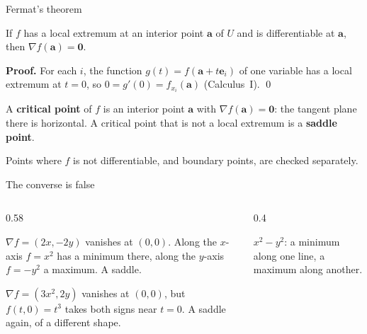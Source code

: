 \documentclass[10pt]{wosm-slides}
\newcommand{\va}{\mathbf{a}}
\begin{document}
\begin{frame}{Fermat's theorem}
  \begin{theorem}[Fermat]
    If $f$ has a local extremum at an interior point $\va$ of $U$ and is differentiable at $\va$,
    then $\nabla f(\va) = \mathbf 0$.
  \end{theorem}
  \pause
  \textbf{Proof.} For each $i$, the function $g(t) = f(\va + t\mathbf e_i)$ of one variable has a
  local extremum at $t = 0$, so $0 = g'(0) = f_{x_i}(\va)$ (Calculus~I). \qed
  \pause
  \begin{definition}
    A \textbf{critical point} of $f$ is an interior point $\va$ with $\nabla f(\va) = \mathbf 0$:
    the tangent plane there is horizontal. A critical point that is not a local extremum is a
    \textbf{saddle point}.
  \end{definition}
  {\small Points where $f$ is not differentiable, and boundary points, are checked separately.\par}
\end{frame}

\begin{frame}{The converse is false}
  \begin{columns}[c]
    \begin{column}{0.58\textwidth}
      \begin{example}[$f(x, y) = x^2 - y^2$]
        $\nabla f = (2x, -2y)$ vanishes at $(0, 0)$. Along the $x$-axis $f = x^2$ has a minimum
        there, along the $y$-axis $f = -y^2$ a maximum. A saddle.
      \end{example}
      \pause
      \begin{example}[$f(x, y) = x^3 + y^2$]
        $\nabla f = (3x^2, 2y)$ vanishes at $(0, 0)$, but $f(t, 0) = t^3$ takes both signs
        near $t = 0$. A saddle again, of a different shape.
      \end{example}
    \end{column}
    \begin{column}{0.4\textwidth}
      \centering
      \par\small $x^2 - y^2$: a minimum along one line, a maximum along another.
    \end{column}
  \end{columns}
\end{frame}
\end{document}
